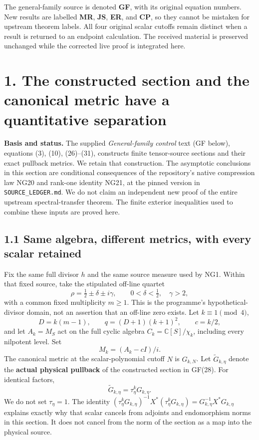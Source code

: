 \documentclass[
  11pt,
]{article}
\begin{document}
The general-family source is denoted \textbf{GF}, with its original
equation numbers. New results are labelled \textbf{MR}, \textbf{JS},
\textbf{ER}, and \textbf{CP}, so they cannot be mistaken for upstream
theorem labels. All four original scalar cutoffs remain distinct when a
result is returned to an endpoint calculation. The received material is
preserved unchanged while the corrected live proof is integrated here.

\newpage

\section{1. The constructed section and the canonical metric have a
quantitative
separation}\label{the-constructed-section-and-the-canonical-metric-have-a-quantitative-separation}

\textbf{Basis and status.} The supplied \emph{General-family control}
text (GF below), equations (3), (10), (26)--(31), constructs finite
tensor-source sections and their exact pullback metrics. We retain that
construction. The asymptotic conclusions in this section are conditional
consequences of the repository's native compression law NG20 and
rank-one identity NG21, at the pinned version in
\texttt{SOURCE\_LEDGER.md}. We do not claim an independent new proof of
the entire upstream spectral-transfer theorem. The finite exterior
inequalities used to combine these inputs are proved here.

\subsection{1.1 Same algebra, different metrics, with every scalar
retained}\label{same-algebra-different-metrics-with-every-scalar-retained}

Fix the same full divisor \(h\) and the same source measure used by NG1.
Within that fixed source, take the stipulated off-line quartet \[
\rho=\tfrac12\pm\delta\pm i\gamma,\qquad 0<\delta<\tfrac12,\quad\gamma>2,
\] with a common fixed multiplicity \(m\ge1\). This is the programme's
hypothetical-divisor domain, not an assertion that an off-line zero
exists. Let \(k\equiv1\pmod4\), \[
D=k(m-1),\qquad q=(D+1)(k+1)^2,\qquad c=k/2,
\] and let \(A_k=M_S\) act on the full cyclic algebra
\(C_k=\mathbb C[S]/\chi_k\), including every nilpotent level. Set \[
M_k=(A_k-cI)/i. \tag{MR1}
\] The canonical metric at the scalar-polynomial cutoff \(N\) is
\(G_{k,N}\). Let \(\widetilde G_{k,\eta}\) denote the \textbf{actual
physical pullback} of the constructed section in GF(28). For identical
factors, \[
\widetilde G_{k,\eta}=\tau_\eta^kG_{k,\eta}.
\] We do not set \(\tau_\eta=1\). The identity
\((\tau_\eta^kG_{k,\eta})^{-1}X^*(\tau_\eta^kG_{k,\eta})=G_{k,\eta}^{-1}X^*G_{k,\eta}\)
explains exactly why that scalar cancels from adjoints and endomorphism
norms in this section. It does not cancel from the norm of the section
as a map into the physical source.
\end{document}
